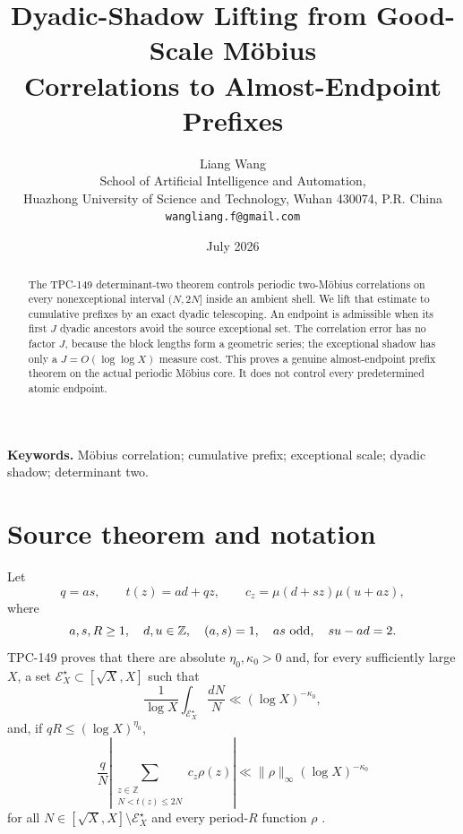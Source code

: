 \documentclass[11pt]{article}
\title{\textbf{Dyadic-Shadow Lifting from Good-Scale M\"obius\\
Correlations to Almost-Endpoint Prefixes}}
\author{Liang Wang\\
\small School of Artificial Intelligence and Automation,\\[-2pt]
\small Huazhong University of Science and Technology, Wuhan 430074, P.R. China\\
\small \texttt{wangliang.f@gmail.com}}
\date{July 2026}
\theoremstyle{definition}
\newcommand{\E}{\mathcal E}
\newcommand{\norm}[1]{\lVert#1\rVert}
\begin{document}
\maketitle

\begin{abstract}
The TPC-149 determinant-two theorem controls periodic two-M\"obius
correlations on every nonexceptional interval \((N,2N]\) inside an
ambient shell.  We lift that estimate to cumulative prefixes by an
exact dyadic telescoping.  An endpoint is admissible when its first
\(J\) dyadic ancestors avoid the source exceptional set.  The
correlation error has no factor \(J\), because the block lengths form
a geometric series; the exceptional shadow has only a
\(J=O(\log\log X)\) measure cost.  This proves a genuine
almost-endpoint prefix theorem on the actual periodic M\"obius core.
It does not control every predetermined atomic endpoint.
\end{abstract}

\noindent\textbf{Keywords.}
M\"obius correlation; cumulative prefix; exceptional scale;
dyadic shadow; determinant two.

\medskip
\noindent{}

\section{Source theorem and notation}

Let
\[
 q=as,\qquad t(z)=ad+qz,\qquad
 c_z=\mu(d+sz)\mu(u+az),
\]
where
\[
 a,s,R\ge1,\quad d,u\in\mathbb Z,\quad
 (a,s)=1,\quad as\ {\rm odd},\quad su-ad=2.
\]
TPC-149 proves that there are absolute
\(\eta_0,\kappa_0>0\) and, for every sufficiently large \(X\), a set
\(\E_X^\star\subset[\sqrt X,X]\) such that
\begin{equation}
 \frac1{\log X}\int_{\E_X^\star}\frac{dN}{N}
 \ll(\log X)^{-\kappa_0},
\label{eq:exception}
\end{equation}
and, if \(qR\le(\log X)^{\eta_0}\),
\begin{equation}
 \frac qN\left|
 \sum_{\substack{z\in\mathbb Z\\N<t(z)\le2N}}
 c_z\rho(z)\right|
 \ll\norm{\rho}_\infty(\log X)^{-\kappa_0}
\label{eq:source}
\end{equation}
for all \(N\in[\sqrt X,X]\setminus\E_X^\star\) and every
period-\(R\) function \(\rho\) \citep{WangTPC149}.
\end{document}
